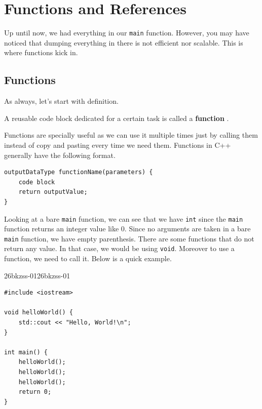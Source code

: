 \documentclass[../../../main.tex]{subfiles}
\begin{document}
\section{Functions and References}

Up until now, we had everything in our \verb|main| function.
However, you may have noticed that dumping everything in there is
not efficient nor scalable. This is where functions kick in.

\subsection{Functions}

As always, let's start with definition.

\begin{definition}{}{}
A reusable code block dedicated for a certain task is called a
\textbf{function} \cite{CS02-5}.
\end{definition}

Functions are specially useful as we can use it multiple times just
by calling them instead of copy and pasting every time we need them.
Functions in C++ generally have the following format.

\begin{basicbox}
\begin{lstlisting}[style=cppstyle]
outputDataType functionName(parameters) {
    code block
    return outputValue;
}
\end{lstlisting}
\end{basicbox}

Looking at a bare \verb|main| function, we can see that we have
\verb|int| since the \verb|main| function returns an integer value
like $0$. Since no arguments are taken in a bare \verb|main| function,
we have empty parenthesis. There are some functions that do not
return any value. In that case, we would be using \verb|void|.
Moreover to use a function, we need to call it. Below is a quick
example.

\begin{cppbox}{26bkzss-01}{26bkzss-01}
\begin{lstlisting}[style=cppstyle]
#include <iostream>

void helloWorld() {
    std::cout << "Hello, World!\n";
}

int main() {
    helloWorld();
    helloWorld();
    helloWorld();
    return 0;
}
\end{lstlisting}
\end{cppbox}
\end{document}
